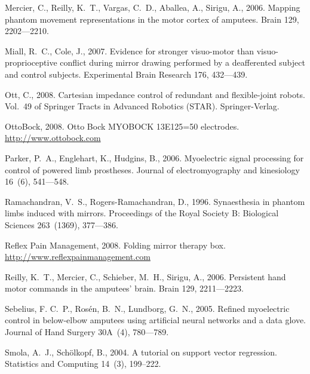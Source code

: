 \documentclass[review,authoryear]{elsarticle}
\begin{document}
\begin{thebibliography}{43}
Mercier, C., Reilly, K.~T., Vargas, C.~D., Aballea, A., Sirigu, A., 2006.
  Mapping phantom movement representations in the motor cortex of amputees.
  Brain 129, 2202---2210.

Miall, R.~C., Cole, J., 2007. Evidence for stronger visuo-motor than
  visuo-proprioceptive conflict during mirror drawing performed by a
  deafferented subject and control subjects. Experimental Brain Research 176,
  432---439.

Ott, C., 2008. Cartesian impedance control of redundant and flexible-joint
  robots. Vol.~49 of Springer Tracts in Advanced Robotics (STAR).
  Springer-Verlag.

OttoBock, 2008. {Otto Bock} {MYOBOCK} {13E125=50} electrodes.
\newline\urlprefix\url{http://www.ottobock.com}

Parker, P.~A., Englehart, K., Hudgins, B., 2006. Myoelectric signal processing
  for control of powered limb prostheses. Journal of electromyography and
  kinesiology 16~(6), 541---548.

Ramachandran, V.~S., Rogers-Ramachandran, D., 1996. Synaesthesia in phantom
  limbs induced with mirrors. Proceedings of the Royal Society {B}: Biological
  Sciences 263~(1369), 377---386.

Reflex Pain Management, 2008. Folding mirror therapy box.
\newline\urlprefix\url{http://www.reflexpainmanagement.com}

Reilly, K.~T., Mercier, C., Schieber, M.~H., Sirigu, A., 2006. Persistent hand
  motor commands in the amputees' brain. Brain 129, 2211---2223.

Sebelius, F. C.~P., Ros\'en, B.~N., Lundborg, G.~N., 2005. Refined myoelectric
  control in below-elbow amputees using artificial neural networks and a data
  glove. Journal of Hand Surgery 30A~(4), 780---789.

Smola, A.~J., Sch\"olkopf, B., 2004. A tutorial on support vector regression.
  Statistics and Computing 14~(3), 199--222.


\end{thebibliography}
\end{document}
